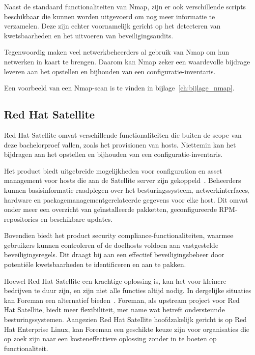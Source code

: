 Naast de standaard functionaliteiten van Nmap, zijn er ook verschillende scripts beschikbaar die kunnen worden uitgevoerd om nog meer informatie te verzamelen.
Deze zijn echter voornamelijk gericht op het detecteren van kwetsbaarheden en het uitvoeren van beveiligingsaudits.

Tegenwoordig maken veel netwerkbeheerders al gebruik van Nmap om hun netwerken in kaart te brengen.
Daarom kan Nmap zeker een waardevolle bijdrage leveren aan het opstellen en bijhouden van een configuratie-inventaris.

Een voorbeeld van een Nmap-scan is te vinden in bijlage~\ref{ch:bijlage_nmap}.

\subsection{Red Hat Satellite}
\label{sub:red-hat-satellite}

Red Hat Satellite omvat verschillende functionaliteiten die buiten de scope van deze bachelorproef vallen, zoals het provisionen van hosts.
Niettemin kan het bijdragen aan het opstellen en bijhouden van een configuratie-inventaris.

Het product biedt uitgebreide mogelijkheden voor configuration en asset management voor hosts die aan de Satellite server zijn gekoppeld~\autocite{rhel-satellite-hosts}.
Beheerders kunnen basisinformatie raadplegen over het besturingssysteem, netwerkinterfaces, hardware en packagemanagementgerelateerde gegevens voor elke host.
Dit omvat onder meer een overzicht van ge\"installeerde pakketten, geconfigureerde RPM-repositories en beschikbare updates.

Bovendien biedt het product security compliance-functionaliteiten, waarmee gebruikers kunnen controleren of de doelhosts voldoen aan vastgestelde beveiligingsregels.
Dit draagt bij aan een effectief beveiligingsbeheer door potenti\"ele kwetsbaarheden te identificeren en aan te pakken.

Hoewel Red Hat Satellite een krachtige oplossing is, kan het voor kleinere bedrijven te duur zijn, en zijn niet alle functies altijd nodig.
In dergelijke situaties kan Foreman een alternatief bieden~\autocite{foreman-introduction}.
Foreman, als upstream project voor Red Hat Satellite, biedt meer flexibiliteit, met name wat betreft ondersteunde besturingssystemen.
Aangezien Red Hat Satellite hoofdzakelijk gericht is op Red Hat Enterprise Linux, kan Foreman een geschikte keuze zijn voor organisaties die op zoek zijn naar een kosteneffectieve oplossing zonder in te boeten op functionaliteit.

